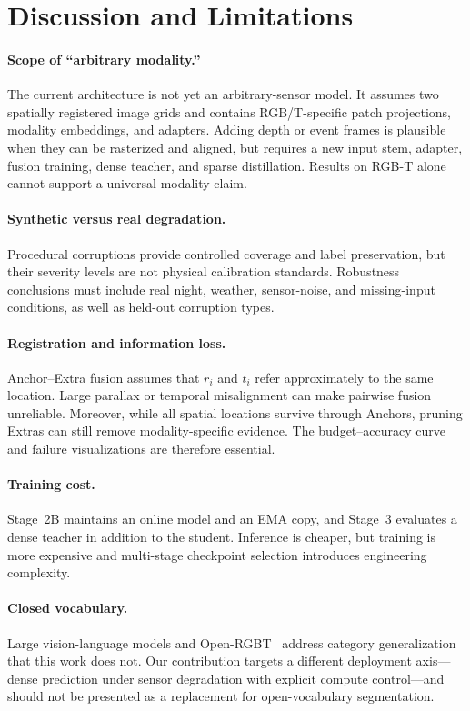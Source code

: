 \documentclass[10pt,twocolumn,letterpaper]{article}
\begin{document}
\section{Discussion and Limitations}
\label{sec:limitations}

\paragraph{Scope of ``arbitrary modality.''}
The current architecture is not yet an arbitrary-sensor model.
It assumes two spatially registered image grids and contains RGB/T-specific patch projections, modality embeddings, and adapters.
Adding depth or event frames is plausible when they can be rasterized and aligned, but requires a new input stem, adapter, fusion training, dense teacher, and sparse distillation.
Results on RGB-T alone cannot support a universal-modality claim.

\paragraph{Synthetic versus real degradation.}
Procedural corruptions provide controlled coverage and label preservation, but their severity levels are not physical calibration standards.
Robustness conclusions must include real night, weather, sensor-noise, and missing-input conditions, as well as held-out corruption types.

\paragraph{Registration and information loss.}
Anchor--Extra fusion assumes that $r_i$ and $t_i$ refer approximately to the same location.
Large parallax or temporal misalignment can make pairwise fusion unreliable.
Moreover, while all spatial locations survive through Anchors, pruning Extras can still remove modality-specific evidence.
The budget--accuracy curve and failure visualizations are therefore essential.

\paragraph{Training cost.}
Stage~2B maintains an online model and an EMA copy, and Stage~3 evaluates a dense teacher in addition to the student.
Inference is cheaper, but training is more expensive and multi-stage checkpoint selection introduces engineering complexity.

\paragraph{Closed vocabulary.}
Large vision-language models and Open-RGBT~\cite{yu2024openrgbt} address category generalization that this work does not.
Our contribution targets a different deployment axis---dense prediction under sensor degradation with explicit compute control---and should not be presented as a replacement for open-vocabulary segmentation.
\end{document}
